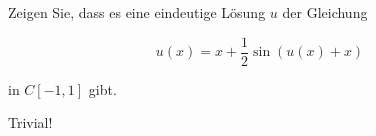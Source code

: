 \begin{exercise}

Zeigen Sie, dass es eine eindeutige Lösung $u$ der Gleichung

\begin{equation*}
  u(x) = x + \frac{1}{2}\sin(u(x)+x)
\end{equation*}

in $C[-1,1]$ gibt.

\end{exercise}

\begin{solution}

Trivial!

\end{solution}
